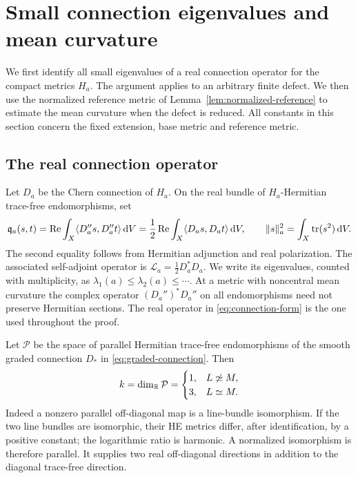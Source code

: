 \section{Small connection eigenvalues and mean curvature}
\label{sec:weak-spectrum}

We first identify all small eigenvalues of a real connection operator for
the compact metrics \(H_a\). The argument applies to an arbitrary finite
defect. We then use the normalized reference metric of
Lemma~\ref{lem:normalized-reference} to estimate the mean curvature when
the defect is reduced. All constants in this section concern the fixed
extension, base metric and reference metric.

\subsection{The real connection operator}

Let \(D_a\) be the Chern connection of \(H_a\). On the real bundle of
\(H_a\)-Hermitian trace-free endomorphisms, set
\begin{equation}\label{eq:connection-form}
 \mathfrak q_a(s,t)
 =\operatorname{Re}\int_X\langle D_a''s,D_a''t\rangle\,\mathrm d V
 =\frac12\operatorname{Re}\int_X\langle D_as,D_at\rangle\,\mathrm d V,
 \qquad \|s\|_a^2=\int_X\operatorname{tr}(s^2)\,\mathrm d V.
\end{equation}
The second equality follows from Hermitian adjunction and real
polarization. The associated self-adjoint operator is
\(\mathcal L_a=\frac12D_a^*D_a\). We write its eigenvalues, counted with
multiplicity, as \(\lambda_1(a)\le\lambda_2(a)\le\cdots\).
At a metric with noncentral mean curvature the complex operator
\((D_a'')^*D_a''\) on all endomorphisms need not preserve Hermitian
sections. The real operator in \eqref{eq:connection-form} is the one
used throughout the proof.

Let \(\mathcal P\) be the space of parallel Hermitian trace-free
endomorphisms of the smooth graded connection \(D_*\) in
\eqref{eq:graded-connection}. Then
\begin{equation}\label{eq:weak-dimension}
 k=\dim_{\mathbb R}\mathcal P=
 \begin{cases}
  1,&L\not\simeq M,\\
  3,&L\simeq M.
 \end{cases}
\end{equation}
Indeed a nonzero parallel off-diagonal map is a line-bundle
isomorphism. If the two line bundles are isomorphic, their HE metrics
differ, after identification, by a positive constant; the logarithmic
ratio is harmonic. A normalized isomorphism is therefore parallel.
It supplies two real off-diagonal directions in addition to the
diagonal trace-free direction.

